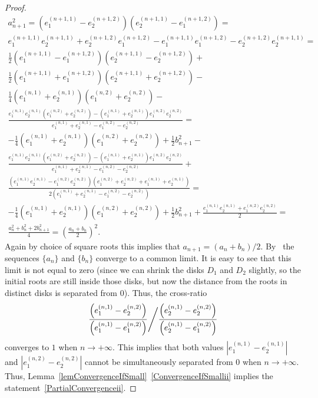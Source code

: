 \documentclass{amsart}
\numberwithin{equation}{section}
\theoremstyle{definition}
\theoremstyle{remark}
\begin{document}
\begin{proof}
		 \begin{multline*}
		     a_{n+1}^2 = \left(e_1^{(n+1,1)} - e_2^{(n+1,2)}\right)\left(e_2^{(n+1,1)} - e_1^{(n+1,2)}\right) = \\ e_1^{(n+1,1)}e_2^{(n+1,1)} + e_2^{(n+1,2)}e_1^{(n+1,2)} - e_1^{(n+1,1)}e_1^{(n+1,2)} - e_2^{(n+1,2)}e_2^{(n+1,1)} = \\  \frac{1}{2}\left(e_1^{(n+1,1)} - e_1^{(n+1,2)}\right)\left(e_2^{(n+1,1)} - e_2^{(n+1,2)}\right) + \\ \frac{1}{2} \left(e_1^{(n+1,1)} + e_1^{(n+1,2)}\right)\left(e_2^{(n+1,1)} + e_2^{(n+1,2)}\right) - \\ \frac{1}{4}\left(e_1^{(n,1)} + e_2^{(n,1)}\right)\left(e_1^{(n,2)} + e_2^{(n,2)}\right) -
		     \\ \frac{e_1^{(n,1)}e_2^{(n,1)}\left(e_1^{(n,2)} + e_2^{(n,2)}\right) - \left(e_1^{(n,1)} + e_2^{(n,1)}\right)e_1^{(n,2)}e_2^{(n,2)}}{e_1^{(n,1)} + e_2^{(n,1)} - e_1^{(n,2)} - e_2^{(n,2)}}  = \\
		      -\frac{1}{4}\left(e_1^{(n,1)} + e_2^{(n,1)}\right)\left(e_1^{(n,2)} + e_2^{(n,2)}\right) + \frac{1}{2}b_{n+1}^2 - \\  \frac{e_1^{(n,1)}e_2^{(n,1)}\left(e_1^{(n,2)} + e_2^{(n,2)}\right) - \left(e_1^{(n,1)} + e_2^{(n,1)}\right)e_1^{(n,2)}e_2^{(n,2)}}{e_1^{(n,1)} + e_2^{(n,1)} - e_1^{(n,2)} - e_2^{(n,2)}} + \\
		      \frac{\left(e_1^{(n,1)}e_2^{(n,1)} - e_1^{(n,2)}e_2^{(n,2)}\right)\left(e_1^{(n,2)} + e_2^{(n,2)} + e_1^{(n,1)} + e_2^{(n,1)}\right)}{2\left(e_1^{(n,1)} + e_2^{(n,1)} - e_1^{(n,2)} - e_2^{(n,2)}\right)} = \\ -\frac{1}{4}\left(e_1^{(n,1)} + e_2^{(n,1)}\right)\left(e_1^{(n,2)} + e_2^{(n,2)}\right) + \frac{1}{2}b_{n+1}^2 + \frac{e_1^{(n,1)}e_2^{(n,1)} + e_1^{(n,2)}e_2^{(n,2)}}{2} = \\ \frac{a_n^2 + b_n^2 + 2b_{n+1}^2}{4} = \left(\frac{a_n + b_n}{2}\right)^2.
		 \end{multline*}
		Again by choice of square roots this implies that $a_{n+1} = (a_n + b_n)/2$. By~\cite[Proposition~1]{Cremona} the sequences $\{a_n\}$ and $\{b_n\}$ converge to a common limit. It is easy to see that this limit is not equal to zero (since we can shrink the disks $D_1$ and $D_2$ slightly, so the initial roots are still inside those disks, but now the distance from the roots in distinct disks is separated from $0$). Thus, the cross-ratio
		\[
		\left. \frac{\left(e_1^{(n,1)} - e_2^{(n,2)}\right)}{\left(e_1^{(n,1)} - e_1^{(n,2)}\right)} \middle/ \frac{\left(e_2^{(n,1)} - e_2^{(n,2)}\right)}{\left(e_2^{(n,1)} - e_1^{(n,2)}\right)} \right.
		\]
		converges to $1$ when $n \to +\infty$. This implies that both values $\left|e_1^{(n,1)} - e_2^{(n,1)}\right|$ and $\left|e_1^{(n,2)} - e_2^{(n,2)}\right|$ cannot be simultaneously separated from $0$ when $n \to +\infty$. Thus, Lemma~\ref{lemConvergenceIfSmall}~\ref{ConvergenceIfSmallii} implies the statement~\ref{PartialConvergenceii}.
		

\end{proof}
\end{document}
